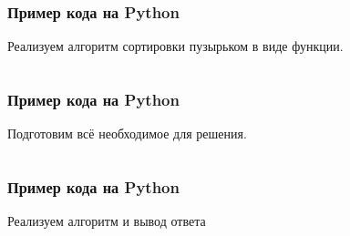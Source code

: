 \documentclass{beamer}
\begin{document}
\begin{frame}[fragile]

    \frametitle{Пример кода на Python}

    Реализуем алгоритм сортировки пузырьком в виде функции.

    \inputminted[frame=single, fontsize=\small, firstline=15, lastline=24]{python}{src/task_26/solution.py}

\end{frame}

\begin{frame}[fragile]

    \frametitle{Пример кода на Python}

    Подготовим всё необходимое для решения.

    \inputminted[frame=single, fontsize=\small, firstline=1, lastline=12]{python}{src/task_26/solution.py}

\end{frame}

\begin{frame}[fragile]

    \frametitle{Пример кода на Python}

    Реализуем алгоритм и вывод ответа

    \inputminted[frame=single, fontsize=\footnotesize, firstline=26]{python}{src/task_26/solution.py}

\end{frame}
\end{document}
